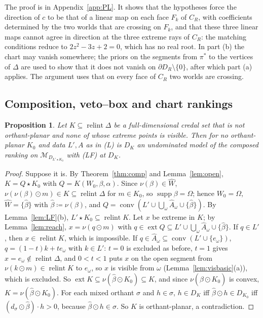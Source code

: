 \documentclass[11pt]{article}
\newcommand{\M}{\mathcal{M}}
\DeclareMathOperator{\conv}{conv}
\DeclareMathOperator{\relint}{relint}
\DeclareMathOperator{\supp}{supp}
\DeclareMathOperator{\ext}{ext}
\theoremstyle{plain}
\newtheorem{proposition}[theorem]{Proposition}
\theoremstyle{definition}
\theoremstyle{remark}
\begin{document}
The proof is in Appendix~\ref{app:PL}. It shows that the hypotheses force the direction
of $c$ to be that of a linear map on each face $F_k$ of $C_R$, with coefficients
determined by the two worlds that are crossing on $F_k$, and that these three linear maps
cannot agree in direction at the three extreme rays of $C_R$: the matching conditions
reduce to $2z^2-3z+2=0$, which has no real root. In part (b) the chart may vanish
somewhere; the priors on the segments from $\pi^\ast$ to the vertices of $\Delta$ are used
to show that it does not vanish on $\partial D_R\setminus\{0\}$, after which part (a)
applies. The argument uses that on every face of $C_R$ two worlds are crossing.

\subsection{Composition, veto--box and chart rankings}\label{sec:excl-comp}

\begin{proposition}\label{prop:compexcl}
Let $K\subseteq\relint\Delta$ be a full-dimensional credal set that is not orthant-planar
and none of whose extreme points is visible. Then for no orthant-planar $K_0$ and data
$L',A$ as in (L) is $D_K$ an undominated model of the composed ranking on
$\M_{D_{L'\star K_0}}$ with (LF) at $D_K$.
\end{proposition}

\begin{proof}
Suppose it is. By Theorem~\ref{thm:comp} and Lemma~\ref{lem:open}, $K=Q\star K_0$ with
$Q=K(W_0,\beta,\alpha)$. Since $\nu(\beta)\in\hat W$, $\nu(\nu(\beta)\odot m)\in K\subseteq
\relint\Delta$ for $m\in K_0$, so $\supp\beta=\Omega$; hence $W_0=\Omega$, $\hat W=\{\hat
\beta\}$ with $\hat\beta\coloneqq\nu(\beta)$, and $Q=\conv(L'\cup\bigcup_\omega\hat
A_\omega\cup\{\hat\beta\})$. By Lemma~\ref{lem:LF}(b), $L'\star K_0\subseteq\relint K$. Let
$x$ be extreme in $K$; by Lemma~\ref{lem:reach}, $x=\nu(q\odot m)$ with $q\in\ext Q
\subseteq L'\cup\bigcup_\omega\hat A_\omega\cup\{\hat\beta\}$. If $q\in L'$, then
$x\in\relint K$, which is impossible. If $q\in\hat A_\omega\subseteq\conv(L'\cup\{e_\omega
\})$, $q=(1-t)k+te_\omega$ with $k\in L'$: $t=0$ is excluded as before, $t=1$ gives $x=
e_\omega\notin\relint\Delta$, and $0<t<1$ puts $x$ on the open segment from $\nu(k\odot m)\in
\relint K$ to $e_\omega$, so $x$ is visible from $\omega$ (Lemma~\ref{lem:visbasic}(a)),
which is excluded. So $\ext K\subseteq\nu(\hat\beta\odot K_0)\subseteq K$, and since
$\nu(\hat\beta\odot K_0)$ is convex, $K=\nu(\hat\beta\odot K_0)$. For each mixed orthant
$\sigma$ and $h\in\sigma$, $h\in D_K$ iff $\hat\beta\odot h\in D_{K_0}$ iff $(d_\sigma\odot
\hat\beta)\cdot h>0$, because $\hat\beta\odot h\in\sigma$. So $K$ is orthant-planar, a
contradiction.
\end{proof}
\end{document}
